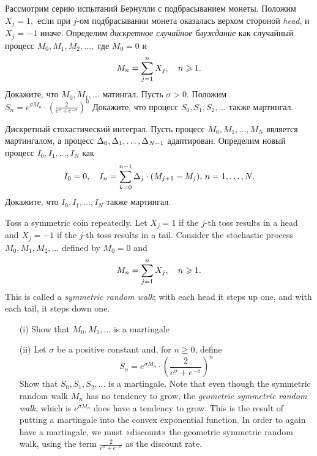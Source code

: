 \begin{problem}
 Рассмотрим серию испытаний Бернулли с подбрасыванием монеты. Положим $X_j=1,$
  если при $j$-ом подбрасывании монета оказалась верхом стороной \emph{head}, и
  $X_j=-1$ иначе. Определим \emph{дискретное случайное блуждание} как
  случайный процесс $M_0,M_1,M_2,\dots,$ где $M_0=0$ и
\[
  M_n=\sum\limits_{j=1}^{n} X_j,\quad n\geqslant 1.
\]
  \ni Докажите, что $M_0,M_1,\dots$ матингал. Пусть $\sigma>0.$
  Положим $S_n=e^{\sigma M_n}\cdot\left(\frac{2}{e^{\sigma}+e^{-\sigma}} \right)^n$
  \ni Докажите, что процесс $S_0,S_1,S_2,\dots$ также мартингал.

\begin{sol}

\end{sol}
\end{problem}

\begin{problem}
 Дискретный стохастический интеграл. Пусть процесс $M_0,M_1,\dots,M_N$ является
  мартингалом, а процесс $\Delta_0,\Delta_1,\dots,\Delta_{N-1}$ адаптирован. Определим новый процесс
  $I_0,I_1,\dots,I_N$ как
 \[
  I_0=0,\quad I_n=\sum\limits_{k=0}^{n-1} \Delta_j\cdot (M_{j+1}-M_j),\, n=1,\dots,N.
\]
  \ni Докажите, что $I_0,I_1,\dots,I_N$ также мартингал.

\begin{sol}

\end{sol}
\end{problem}

\begin{problem}
 Toss a symmetric coin repeatedly. Let $X_j=1$ if the $j$-th toss
results in a head and $X_j=-1$ if the $j$-th toss results in a tail. Consider the
stochastic process $M_0,M_1,M_2,\dots$ defined by $M_0=0$ and
\[
M_n=\sum\limits_{j=1}^{n} X_j,\quad n\geqslant 1.
\]
\ni This is called a \emph{symmetric random walk}; with each head it steps up one,
and with each tail, it steps down one.

\begin{itemize}
\item[(i)] Show that $M_0,M_1,\dots$ is a martingale

\item[(ii)] Let $\sigma$ be a positive constant and, for $n\ge 0$, define
\[
S_n=e^{\sigma M_n}\cdot\left(\frac{2}{e^{\sigma}+e^{-\sigma}} \right)^n
\]
\ni Show that $S_0,S_1,S_2,\dots$ is a martingale. Note that even though the symmetric random
walk $M_n$ has no tendency to grow, the \emph{geometric symmetric random walk}, which is
$e^{\sigma M_n}$ does have a tendency to grow. This is the result of putting a martingale into
the convex exponential function. In order to again have a martingale, we must «discount» the
geometric symmetric random walk, using the term  $\frac{2}{e^{\sigma}+e^{-\sigma}}$ as the discount rate.
\end{itemize}

\begin{sol}

\end{sol}
\end{problem}

